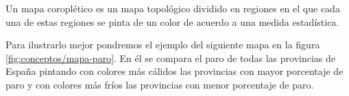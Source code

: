 Un mapa coroplético \cite{wiki:mapascoropleticos} es un mapa topológico dividido en regiones en el que cada una de estas regiones se pinta de un color de acuerdo a una medida estadística.

Para ilustrarlo mejor pondremos el ejemplo del siguiente mapa en la figura \ref{fig:conceptos/mapa-paro}. En él se compara el paro de todas las provincias de España pintando con colores más cálidos las provincias con mayor porcentaje de paro y con colores más fríos las provincias con menor porcentaje de paro.


